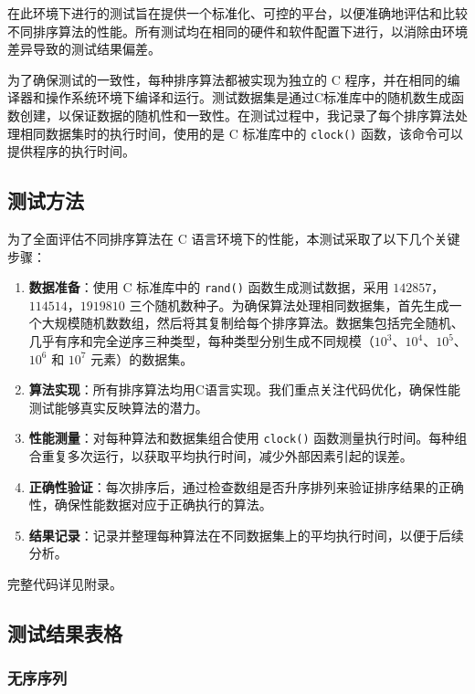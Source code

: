 \documentclass[12pt]{article}
\begin{document}
在此环境下进行的测试旨在提供一个标准化、可控的平台，以便准确地评估和比较不同排序算法的性能。所有测试均在相同的硬件和软件配置下进行，以消除由环境差异导致的测试结果偏差。

为了确保测试的一致性，每种排序算法都被实现为独立的 C 程序，并在相同的编译器和操作系统环境下编译和运行。测试数据集是通过C标准库中的随机数生成函数创建，以保证数据的随机性和一致性。在测试过程中，我记录了每个排序算法处理相同数据集时的执行时间，使用的是 C 标准库中的 \verb|clock()| 函数，该命令可以提供程序的执行时间。

\subsection{测试方法}

为了全面评估不同排序算法在 C 语言环境下的性能，本测试采取了以下几个关键步骤：

\begin{enumerate}
    \item \textbf{数据准备}：使用 C 标准库中的 \verb|rand()| 函数生成测试数据，采用 $142857$，$114514$，$1919810$ 三个随机数种子。为确保算法处理相同数据集，首先生成一个大规模随机数数组，然后将其复制给每个排序算法。数据集包括完全随机、几乎有序和完全逆序三种类型，每种类型分别生成不同规模（$10^3$、$10^4$、$10^5$、$10^6$ 和 $10^7$ 元素）的数据集。
    \item \textbf{算法实现}：所有排序算法均用C语言实现。我们重点关注代码优化，确保性能测试能够真实反映算法的潜力。
    \item \textbf{性能测量}：对每种算法和数据集组合使用 \verb|clock()| 函数测量执行时间。每种组合重复多次运行，以获取平均执行时间，减少外部因素引起的误差。
    \item \textbf{正确性验证}：每次排序后，通过检查数组是否升序排列来验证排序结果的正确性，确保性能数据对应于正确执行的算法。
    \item \textbf{结果记录}：记录并整理每种算法在不同数据集上的平均执行时间，以便于后续分析。
\end{enumerate}

完整代码详见附录。

\newpage 
\subsection{测试结果表格}

\subsubsection{无序序列}
\end{document}
